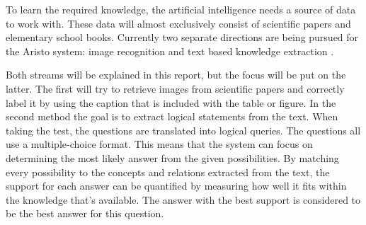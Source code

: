 To learn the required knowledge, the artificial intelligence needs a source of data to work with.
These data will almost exclusively consist of scientific papers and elementary school books. 
Currently two separate directions are being pursued for the Aristo system: image recognition \cite{pdffigures2} and text based knowledge extraction \cite{probseman,sciencequestions}.

Both streams will be explained in this report, but the focus will be put on the latter.
The first will try to retrieve images from scientific papers and correctly label it by using the caption that is included with the table or figure.
In the second method the goal is to extract logical statements from the text. When taking the test, the questions are translated into logical queries.
The questions all use a multiple-choice format. This means that the system can focus on determining the most likely answer from the given possibilities.
By matching every possibility to the concepts and relations extracted from the text, the support for each answer can be quantified by measuring how well it fits within the knowledge that's available.
The answer with the best support is considered to be the best answer for this question.
